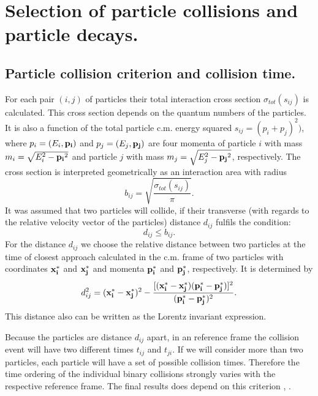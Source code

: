 \section{Selection of particle collisions and particle decays.}

\subsection{Particle collision criterion and collision time.}

\hspace{1.0em}For each pair $(i,j)$ of particles their total interaction
cross section $\sigma_{tot}(s_{ij})$ is calculated. This cross section
depends on the quantum numbers of the particles. It is also a function of
the total particle c.m. energy squared $s_{ij} = (p_i + p_j)^2)$, where
$p_i = (E_i, {\bf p_i})$ and $p_j=(E_j, {\bf p_j})$ are four momenta of
particle $i$ with mass $m_i = \sqrt{E^2_i - {\bf p_i}^2}$ and particle
$j$ with mass $m_j = \sqrt{E^2_j - {\bf p_j}^2}$, respectively.  The
cross section is interpreted geometrically as an interaction area with
radius
\begin{equation}
\label{SCD1}b_{ij} = \sqrt{\frac{\sigma_{tot}(s_{ij})}{\pi}}.
\end{equation}
It was assumed that two particles will collide, if their transverse
(with regards to the relative velocity vector of the particles) distance
$d_{ij}$ fulfils the condition:
\begin{equation}
\label{SCD2} d_{ij} \leq b_{ij}.
\end{equation}
For the distance $d_{ij}$ we choose
 the relative distance between two particles at
the time of closest approach calculated in the c.m. frame of two
particles with coordinates ${\bf x^{*}_i}$ and ${\bf x^{*}_j}$ and
momenta ${\bf p^{*}_i}$ and ${\bf p^{*}_j}$, respectively. It is
determined by
\begin{equation}
\label{SCD3} d^2_{ij} = ({\bf x^{*}_i} - {\bf x^{*}_j})^2 - 
\frac{[({\bf x^{*}_i} - {\bf x^{*}_j})({\bf p^{*}_i} - {\bf p^{*}_j})]^2}
{({\bf p^{*}_i} - {\bf p^{*}_j})^2}.
\end{equation}
This distance also can be    
written as the Lorentz invariant expression.

Because the particles are distance $d_{ij}$ apart, in an reference frame
the collision event will have two different times $t_{ij}$ and $t_{ji}$.
If we will consider more than two particles, each particle will have a
set of possible collision times. Therefore the time ordering of the
individual binary collisions strongly varies with the respective
reference frame. The final results does depend on this criterion
\cite{KDCDN84}, \cite{KBHMP95}. 

